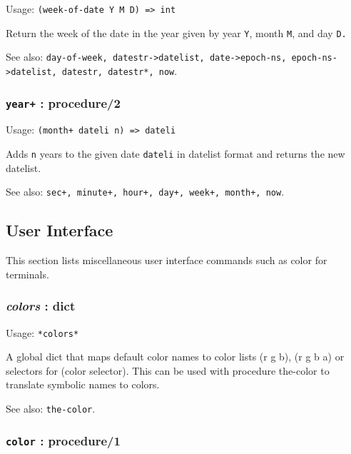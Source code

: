 \documentclass[
]{article}
\newcommand{\passthrough}[1]{#1}
\begin{document}
Usage: \passthrough{\lstinline!(week-of-date Y M D) => int!}

Return the week of the date in the year given by year
\passthrough{\lstinline!Y!}, month \passthrough{\lstinline!M!}, and day
\passthrough{\lstinline!D.!}

See also:
\passthrough{\lstinline!day-of-week, datestr->datelist, date->epoch-ns, epoch-ns->datelist, datestr, datestr*, now!}.

\hypertarget{year-procedure2}{%
\subsubsection{\texorpdfstring{\texttt{year+} :
procedure/2}{year+ : procedure/2}}\label{year-procedure2}}

Usage: \passthrough{\lstinline!(month+ dateli n) => dateli!}

Adds \passthrough{\lstinline!n!} years to the given date
\passthrough{\lstinline!dateli!} in datelist format and returns the new
datelist.

See also:
\passthrough{\lstinline!sec+, minute+, hour+, day+, week+, month+, now!}.

\hypertarget{user-interface}{%
\subsection{User Interface}\label{user-interface}}

This section lists miscellaneous user interface commands such as color
for terminals.

\hypertarget{colors-dict}{%
\subsubsection{\texorpdfstring{\emph{colors} :
dict}{colors : dict}}\label{colors-dict}}

Usage: \passthrough{\lstinline!*colors*!}

A global dict that maps default color names to color lists (r g b), (r g
b a) or selectors for (color selector). This can be used with procedure
the-color to translate symbolic names to colors.

See also: \passthrough{\lstinline!the-color!}.

\hypertarget{color-procedure1}{%
\subsubsection{\texorpdfstring{\texttt{color} :
procedure/1}{color : procedure/1}}\label{color-procedure1}}
\end{document}
